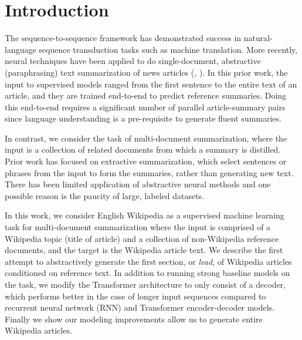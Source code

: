 \section{Introduction}
The sequence-to-sequence framework has demonstrated success in
natural-language sequence
transduction tasks such as machine translation.
More recently,
neural techniques have been applied to do single-document,
abstractive (paraphrasing)
text summarization of news
articles (\cite{Rush2015}, \cite{nallapati2016abstractive}). In this prior work, the input to
supervised models ranged from the first sentence to the entire
text of an article, and they are trained end-to-end to predict reference summaries.
Doing this end-to-end requires a significant number of parallel
article-summary pairs since language understanding
is a pre-requisite to generate fluent summaries.

In contrast, we consider the task of multi-document summarization, where
the input is a collection of related documents from which a summary is
distilled. Prior work has focused on extractive summarization,
which select sentences or phrases from the input to form the summaries, rather
than generating new text.
There has been limited application of abstractive neural methods and one
possible reason is the paucity of large, labeled datasets.

In this work,
we consider English Wikipedia as a supervised machine learning task
for multi-document summarization where the input is comprised of a Wikipedia
topic (title of article) and a collection of non-Wikipedia reference documents,
and the target is the Wikipedia article text.
We describe the first attempt to abstractively
generate the first section, or \textit{lead}, of Wikipedia articles
conditioned on reference text. In addition to
running strong baseline models on the task, we modify the Transformer architecture 
\citep{vaswani2017attention} to only consist of a decoder,
which performs better in the case of
longer input sequences compared to recurrent neural network (RNN) and Transformer encoder-decoder models.
Finally we show our modeling improvements allow us to generate entire Wikipedia articles.
